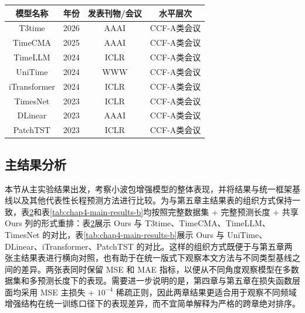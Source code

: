 \begin{table}[!htb]
\centering
\small
\setlength{\tabcolsep}{3.6pt}
\renewcommand{\arraystretch}{0.96}
\label{tab:chap4-baselines}
\begin{tabular}{c|c|c|c}
\toprule
\textbf{模型名称} & \textbf{年份} & \textbf{发表刊物/会议} & \textbf{水平层次} \\
\midrule
T3time & 2026 & AAAI & CCF-A类会议 \\
TimeCMA & 2025 & AAAI & CCF-A类会议 \\
TimeLLM & 2024 & ICLR & CCF-A类会议 \\
UniTime & 2024 & WWW & CCF-A类会议 \\
iTransformer & 2024 & ICLR & CCF-A类会议 \\
TimesNet & 2023 & ICLR & CCF-A类会议 \\
DLinear & 2023 & AAAI & CCF-A类会议 \\
PatchTST & 2023 & ICLR & CCF-A类会议 \\
\bottomrule
\end{tabular}
\end{table} \subsection{主结果分析} 本节从主实验结果出发，考察小波包增强模型的整体表现，并将结果与统一框架基线以及其他代表性长程预测方法进行比较。为与第五章主结果表的组织方式保持一致，表\ref{tab:chap4-main-results-a}和表\ref{tab:chap4-main-results-b}均按照完整数据集 + 完整预测长度 + 共享 Ours 列的形式重排：表\ref{tab:chap4-main-results-a}展示 Ours 与 T3time、TimeCMA、TimeLLM、TimesNet 的对比，表\ref{tab:chap4-main-results-b}展示 Ours 与 UniTime、DLinear、iTransformer、PatchTST 的对比。这样的组织方式既便于与第五章两张主结果表进行横向对照，也有助于在统一版式下观察本文方法与不同类型基线之间的差异。两张表同时保留 MSE 和 MAE 指标，以便从不同角度观察模型在多数据集和多预测长度下的表现。需要进一步说明的是，第四章与第五章在损失函数层面均采用 MSE 主损失 + $10^{-4}$ 稀疏正则，因此两章结果更适合用于观察不同频域增强结构在统一训练口径下的表现差异，而不宜简单解释为严格的跨章绝对排序。 \begin{table}[!htbp]
\centering
\small
\setlength{\tabcolsep}{3.6pt}
\renewcommand{\arraystretch}{0.96}
\label{tab:chap4-main-results-a}
\begin{tabular}{c|c|cc|cc|cc|cc|cc}

\end{tabular}
\end{table}
